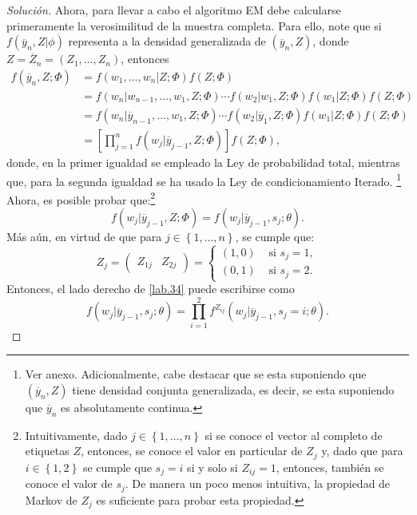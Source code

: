 \documentclass[10.5pt,notitlepage]{article}
\newenvironment{solucion}
  {\begin{proof}[Solución]}
  {\end{proof}}
\newcommand{\corch}[1]{\left[ #1 \right]}
\newcommand{\kis}[1]{\left\{ #1 \right\}}
\newcommand{\Matrix}[1]{\begin{pmatrix} #1 \end{pmatrix}}
\theoremstyle{plain}
\begin{document}
\begin{solucion}
Ahora, para llevar a cabo el algoritmo EM debe calcularse primeramente la verosimilitud de la muestra completa. Para ello, note que si \(f(\overline{y}_n,Z|\phi)\) representa a la densidad generalizada de \((\overline{y}_n,Z)\), donde \(Z = \overline{Z}_{n} = (Z_1, \hdots, Z_n)\), entonces
\begin{align}\label{lab.33}
    f(\overline{y}_n,Z;\Phi) &= f(w_1,\hdots,w_n|Z; \Phi)f(Z ; \Phi) \nonumber\\
                  &= f(w_n| w_{n-1},\hdots,w_{1},Z;\Phi)\cdots f(w_{2}|w_{1},Z; \Phi)f(w_{1}|Z; \Phi)f(Z ; \Phi)\nonumber\\ 
                  &=  f(w_n| \overline{y}_{n-1},\hdots,w_{1},Z;\Phi)\cdots f(w_{2}|\overline{y}_{1},Z; \Phi)f(w_{1}|Z; \Phi)f(Z ; \Phi) \nonumber\\
                  &= \corch{\prod_{j = 1}^{n}f(w_{j} | \overline{y}_{j-1}, Z ; \Phi)}f(Z; \Phi),
\end{align}
donde, en la primer igualdad se empleado la Ley de probabilidad total, mientras que, para la segunda igualdad se ha usado la Ley de condicionamiento Iterado. \footnote{Ver anexo. Adicionalmente, cabe destacar que se esta suponiendo que \((\overline{y}_{n},Z)\) tiene densidad conjunta generalizada, es decir, se esta suponiendo que \(\overline{y}_n\) es absolutamente continua.} Ahora, es posible probar que:\footnote{Intuitivamente, dado \(j \in \kis{1, \hdots,n}\) si se conoce el vector al completo de etiquetas \(Z\), entonces, se conoce el valor en particular de \(Z_{j}\) y, dado que para \(i \in \kis{1,2}\) se cumple que \(s_{j} = i\) si y solo si \(Z_{ij} =1\), entonces, también se conoce el valor de \(s_{j}\). De manera un poco menos intuitiva, la propiedad de Markov de \(Z_j\) es suficiente para probar esta propiedad.}
\begin{equation}\label{lab.34}
f(w_{j} | \overline{y}_{j-1}, Z ; \Phi)  = f(w_{j} | \overline{y}_{j-1}, s_{j};\theta).      
\end{equation}
Más aún, en virtud de que para \(j \in \kis{1, \hdots, n}\), se cumple que:
\[
Z_{j} = \Matrix{ Z_{1j} & Z_{2j}} = \begin{cases}
(1,0) & \text{ si } s_{j}=1, \\ 
(0,1) & \text{ si } s_{j}=2 . 
\end{cases}
\]
Entonces, el lado derecho de \eqref{lab.34} puede escribirse como 
\begin{equation}\label{lab.35}
f(w_{j} | \overline{y}_{j-1}, s_{j};\theta) = \prod_{i = 1}^{2}f^{Z_{ij}}(w_{j} | \overline{y}_{j-1}, s_{j} = i;\theta).      

\end{equation}
\end{solucion}
\end{document}
